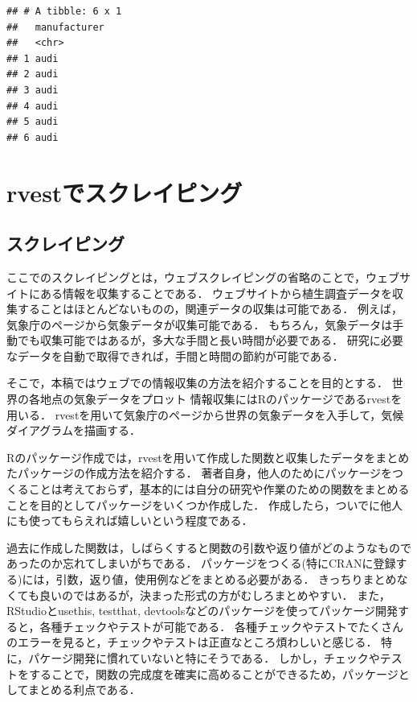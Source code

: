 \documentclass[
]{article}
\begin{document}
\begin{verbatim}
## # A tibble: 6 x 1
##   manufacturer
##   <chr>       
## 1 audi        
## 2 audi        
## 3 audi        
## 4 audi        
## 5 audi        
## 6 audi
\end{verbatim}

\hypertarget{rvest}{%
\section{rvestでスクレイピング}\label{rvest}}

\hypertarget{ux30b9ux30afux30ecux30a4ux30d4ux30f3ux30b0}{%
\subsection{スクレイピング}\label{ux30b9ux30afux30ecux30a4ux30d4ux30f3ux30b0}}

ここでのスクレイピングとは，ウェブスクレイピングの省略のことで，ウェブサイトにある情報を収集することである．
ウェブサイトから植生調査データを収集することはほとんどないものの，関連データの収集は可能である．
例えば，気象庁のページから気象データが収集可能である．
もちろん，気象データは手動でも収集可能ではあるが，多大な手間と長い時間が必要である．
研究に必要なデータを自動で取得できれば，手間と時間の節約が可能である．

そこで，本稿ではウェブでの情報収集の方法を紹介することを目的とする．
世界の各地点の気象データをプロット
情報収集にはRのパッケージであるrvestを用いる．
rvestを用いて気象庁のページから世界の気象データを入手して，気候ダイアグラムを描画する．

Rのパッケージ作成では，rvestを用いて作成した関数と収集したデータをまとめたパッケージの作成方法を紹介する．
著者自身，他人のためにパッケージをつくることは考えておらず，基本的には自分の研究や作業のための関数をまとめることを目的としてパッケージをいくつか作成した．
作成したら，ついでに他人にも使ってもらえれば嬉しいという程度である．

過去に作成した関数は，しばらくすると関数の引数や返り値がどのようなものであったのか忘れてしまいがちである．
パッケージをつくる(特にCRANに登録する)には，引数，返り値，使用例などをまとめる必要がある．
きっちりまとめなくても良いのではあるが，決まった形式の方がむしろまとめやすい．
また，RStudioとusethis, testthat, devtoolsなどのパッケージを使ってパッケージ開発すると，各種チェックやテストが可能である．
各種チェックやテストでたくさんのエラーを見ると，チェックやテストは正直なところ煩わしいと感じる．
特に，パケージ開発に慣れていないと特にそうである．
しかし，チェックやテストをすることで，関数の完成度を確実に高めることができるため，パッケージとしてまとめる利点である．
\end{document}

